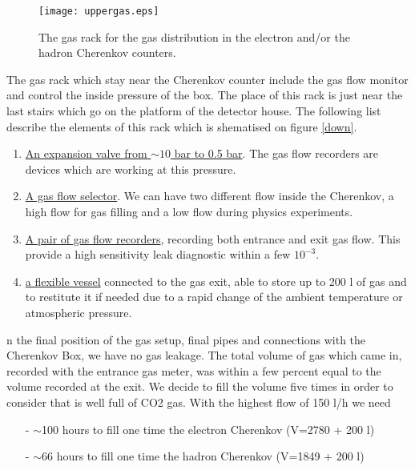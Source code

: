 \documentclass[12pt]{article}
\begin{document}

\begin{figure}
\begin{center}
\texttt{[image: uppergas.eps]}
{\linespread{1.}
\caption[Cherenkov gas flow]{The gas rack for the gas distribution in the electron and/or
the hadron Cherenkov counters.}
\label{fen}}
\end{center}
\end{figure}

The gas rack which stay near the Cherenkov counter include the gas flow
 monitor and control the inside pressure of the box. The place of this rack is
just near the last stairs which go on the platform of the detector house. The
following list describe the elements of this rack which is shematised on
 figure \ref{down}.
\begin{enumerate}
\item \underline{An expansion valve from $\sim 10$ bar to 0.5 bar}. The
 gas flow recorders are devices which are working at this pressure.
\item \underline{A gas flow selector}. We can have two different flow
 inside the Cherenkov, a high flow for gas filling and a low flow 
during physics experiments. 
\item \underline{A pair of gas flow recorders}, recording both entrance 
and exit gas flow.
This provide a high sensitivity leak diagnostic within a few $10^{-3}$.
\item \underline{a flexible vessel} connected to the gas exit, able to 
store up to 200 l of gas and to restitute it if needed due to a rapid change 
of the ambient temperature or atmospheric pressure.
\end{enumerate}


n the final position of the gas setup, final pipes and connections with the
 Cherenkov Box, we have no gas leakage. The total volume of gas which came in, 
recorded with the entrance gas meter, was within a few percent equal to the
volume recorded at the exit.
We decide to fill the volume five times 
in order to consider that is well full of CO2 gas. 
With the highest flow of 150 l/h we need 
\begin{itemize}
\item[-] $\sim$100 hours to fill one time the electron Cherenkov
 (V=2780 + 200 l)
\item[-] $\sim$66 hours to fill one time the hadron Cherenkov 
(V=1849 + 200 l)
\end{itemize}
\end{document}
